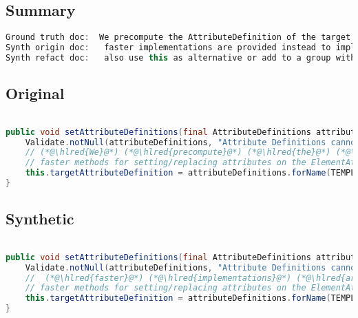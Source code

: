 \documentclass[11pt]{article}
\DeclareRobustCommand{\hlred}[1]{{\sethlcolor{YellowOrange}\hl{#1}}}
\begin{document}
\subsection{Summary}

\begin{lstlisting}[language=java]
Ground truth doc:  We precompute the AttributeDefinition of the target attribute in order to being able to use much
Synth origin doc:   faster implementations are provided instead to implement additional and more sophisticated or intuitive or useful but
Synth refact doc:   also use this as alternative or add to a group with other groups for performance in
\end{lstlisting}

\subsection{Original}
\begin{lstlisting}[language=java]

public void setAttributeDefinitions(final AttributeDefinitions attributeDefinitions) {
    Validate.notNull(attributeDefinitions, "Attribute Definitions cannot be null");
    // (*@\hlred{We}@*) (*@\hlred{precompute}@*) (*@\hlred{the}@*) (*@\hlred{AttributeDefinition}@*) (*@\hlred{of}@*) (*@\hlred{the}@*) (*@\hlred{target}@*) (*@\hlred{attribute}@*) (*@\hlred{in}@*) (*@\hlred{order}@*) (*@\hlred{to}@*) (*@\hlred{being}@*) (*@\hlred{able}@*) (*@\hlred{to}@*) (*@\hlred{use}@*) (*@\hlred{much}@*)
    // faster methods for setting/replacing attributes on the ElementAttributes implementation
    this.targetAttributeDefinition = attributeDefinitions.forName(TEMPLATE_MODE, TARGET_ATTR_NAME);
}
\end{lstlisting}
\subsection{Synthetic}

\begin{lstlisting}[language=java]

public void setAttributeDefinitions(final AttributeDefinitions attributeDefinitions) {
    Validate.notNull(attributeDefinitions, "Attribute Definitions cannot be null");
    //  (*@\hlred{faster}@*) (*@\hlred{implementations}@*) (*@\hlred{are}@*) (*@\hlred{provided}@*) (*@\hlred{instead}@*) (*@\hlred{to}@*) (*@\hlred{implement}@*) (*@\hlred{additional}@*) (*@\hlred{and}@*) (*@\hlred{more}@*) (*@\hlred{sophisticated}@*) (*@\hlred{or}@*) (*@\hlred{intuitive}@*) (*@\hlred{or}@*) (*@\hlred{useful}@*) (*@\hlred{but}@*)
    // faster methods for setting/replacing attributes on the ElementAttributes implementation
    this.targetAttributeDefinition = attributeDefinitions.forName(TEMPLATE_MODE, TARGET_ATTR_NAME);
}
\end{lstlisting}
\end{document}
